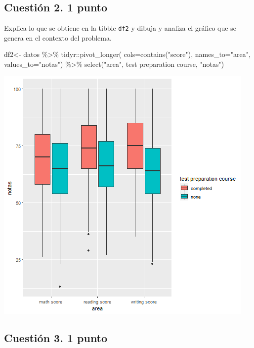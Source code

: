\documentclass[
]{article}
\newenvironment{Shaded}{\begin{snugshade}}{\end{snugshade}}
\newcommand{\AttributeTok}[1]{\textcolor[rgb]{0.77,0.63,0.00}{#1}}
\newcommand{\FunctionTok}[1]{\textcolor[rgb]{0.00,0.00,0.00}{#1}}
\newcommand{\NormalTok}[1]{#1}
\newcommand{\OtherTok}[1]{\textcolor[rgb]{0.56,0.35,0.01}{#1}}
\newcommand{\SpecialCharTok}[1]{\textcolor[rgb]{0.00,0.00,0.00}{#1}}
\newcommand{\StringTok}[1]{\textcolor[rgb]{0.31,0.60,0.02}{#1}}
\begin{document}
\hypertarget{cuestiuxf3n-2.-1-punto}{%
\subsection{\texorpdfstring{Cuestión 2. \textbf{1
punto}}{Cuestión 2. 1 punto}}\label{cuestiuxf3n-2.-1-punto}}

Explica lo que se obtiene en la tibble \texttt{df2} y dibuja y analiza
el gráfico que se genera en el contexto del problema.

\begin{Shaded}
\begin{Highlighting}[]
\NormalTok{df2}\OtherTok{\textless{}{-}}\NormalTok{ datos }\SpecialCharTok{\%\textgreater{}\%}
\NormalTok{  tidyr}\SpecialCharTok{::}\FunctionTok{pivot\_longer}\NormalTok{(}
    \AttributeTok{cols=}\FunctionTok{contains}\NormalTok{(}\StringTok{"score"}\NormalTok{),}
    \AttributeTok{names\_to=}\StringTok{"area"}\NormalTok{, }\AttributeTok{values\_to=}\StringTok{"notas"}\NormalTok{) }\SpecialCharTok{\%\textgreater{}\%}
  \FunctionTok{select}\NormalTok{(}\StringTok{"area"}\NormalTok{, }\StringTok{\textasciigrave{}}\AttributeTok{test preparation course}\StringTok{\textasciigrave{}}\NormalTok{, }\StringTok{"notas"}\NormalTok{)}
\end{Highlighting}
\end{Shaded}

\begin{center}\includegraphics[width=0.6\linewidth]{plot2} \end{center}

\hypertarget{cuestiuxf3n-3.-1-punto}{%
\subsection{\texorpdfstring{Cuestión 3. \textbf{1
punto}}{Cuestión 3. 1 punto}}\label{cuestiuxf3n-3.-1-punto}}
\end{document}
